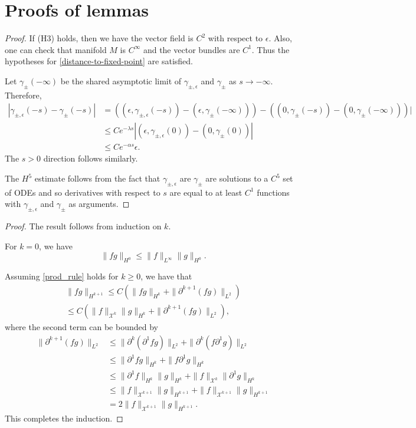 \chapter{Proofs of lemmas}\label{lemma-appendix}
\heteroclinicorbitsobolev*
\begin{proof}
	 If (H3) holds, then we have the vector field is \(C^2\) with respect to \(\epsilon\). Also, one can check that manifold \(M\) is \(C^\infty\) and the vector bundles are \(C^1\). Thus the hypotheses for \cref{distance-to-fixed-point} are satisfied.
	 
	 Let \(\gamma_\pm(-\infty)\) be the shared asymptotic limit of \(\gamma_{\pm, \epsilon}\) and \(\gamma_\pm\) as \(s\to-\infty\). Therefore,
	 \begin{align*}
	 	|\gamma_{\pm, \epsilon}(-s) - \gamma_\pm(-s)| &=((\epsilon, \gamma_{\pm,\epsilon}(-s)) - (\epsilon, \gamma_\pm(-\infty)) )- ((0, \gamma_{\pm}(-s)) - (0, \gamma_\pm(-\infty)))| \\
	 	&\leq C e^{-\lambda s} |(\epsilon, \gamma_{\pm,\epsilon}(0)) - (0,\gamma_\pm(0)) | \\
	 	&\leq C e^{-\alpha s} \epsilon .
	 \end{align*}
 	The \(s> 0\) direction follows similarly. 
 	
 	The \(H^5\) estimate follows from the fact that \(\gamma_{\pm,\epsilon}\) are \(\gamma_{\pm}\) are solutions to a \(C^5\) set of ODEs and so derivatives with respect to \(s\) are equal to at least \(C^1\) functions with \(\gamma_{\pm, \epsilon}\) and \(\gamma_{\pm}\) as arguments.
\end{proof}

\prodruleone*
\begin{proof}
	The result follows from induction on \(k\).
	
	For \(k = 0\), we have
	\begin{equation}
		\| f g \|_{H^0} \leq \| f \|_{L^\infty} \| g\|_{H^0}.
	\end{equation}
	
	Assuming \cref{prod_rule} holds for \(k\geq 0\), we have that 
	\begin{align*}
		\| f g \|_{H^{k+1}} \leq C \left( \| f g \|_{H^k} + \| \partial^{k+1}(fg) \|_{L^2}\right) \\
		\leq C \left( \| f\|_{\mathcal X^k} \| g \|_{H^k} + \| \partial^{k+1}(fg) \|_{L^2} \right),
	\end{align*}
	where the second term can be bounded by 
	\begin{align*}
		\| \partial^{k+1}(fg) \|_{L^2} &\leq \| \partial^k(\partial^1 f g ) \|_{L^2} + \| \partial^k(f \partial^1 g) \|_{L^2} \\
		&\leq \| \partial^1 f  g \|_{H^k} + \| f \partial^1 g \|_{H^k} \\
		&\leq \| \partial^1 f \|_{H^k} \|g\|_{H^k} + \|f\|_{\mathcal X^k} \|\partial^1 g\|_{H^k} \\
		&\leq \| f \|_{\mathcal X^{k+1}} \| g\|_{H^{k+1}} + \|f \|_{\mathcal X^{k+1}} \|g\|_{H^{k+1}} \\
		&= 2  \| f \|_{\mathcal X^{k+1}} \| g\|_{H^{k+1}}.
	\end{align*}
	This completes the induction.
\end{proof}

